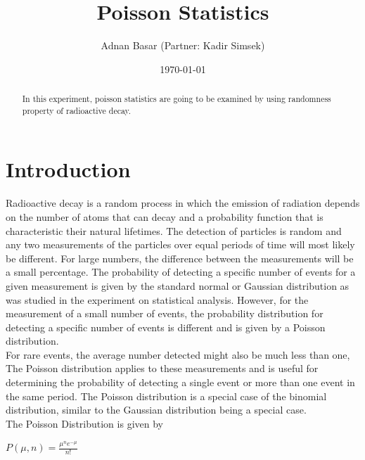 \documentclass[aps,twocolumn,secnumarabic,nobalancelastpage,amsmath,amssymb,
nofootinbib]{revtex4}
\begin{document}
\title{Poisson Statistics}
\author         {Adnan Basar (Partner: Kadir Simsek)}
\date{\today}





\begin{abstract}
In this experiment, poisson statistics are going to be examined by using randomness property of radioactive decay. 
\end{abstract}

\maketitle

\section{Introduction}
Radioactive decay is a random process in which the emission of radiation depends on the 
number of atoms that can decay and a probability function that is characteristic their 
natural lifetimes. The detection of particles is random and any two measurements of the 
particles over equal periods of time will most likely be different. For large numbers, the 
difference between the measurements will be a small percentage. The probability of 
detecting a specific number of events for a given measurement is given by the standard 
normal or Gaussian distribution as was studied in the experiment on statistical analysis. 
However, for the measurement of a small number of events, the probability distribution 
for detecting a specific number of events is different and is given by a Poisson 
distribution.\\

For rare events, the average number detected might also be much less than one, The 
Poisson distribution applies to these measurements and is useful for determining the 
probability of detecting a single event or more than one event in the same period. The 
Poisson distribution is a special case of the binomial distribution, similar to the Gaussian 
distribution being a special case.\\

The Poisson Distribution is given by
\begin{center}
$P(\mu,n)=\frac{{\mu}^{n}{e}^{-\mu}}{n!}$
\end{center}
\end{document}
